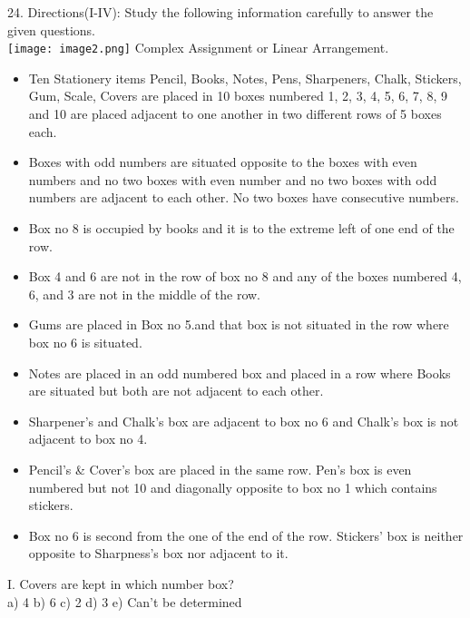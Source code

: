 \documentclass[
]{article}
\begin{document}
24. Directions(I-IV): Study the following information carefully to answer the given questions.\\
\texttt{[image: image2.png]}
Complex Assignment or Linear Arrangement.\\
\begin{itemize}
\item Ten Stationery items Pencil, Books, Notes, Pens, Sharpeners, Chalk, Stickers, Gum, Scale,
Covers are placed in 10 boxes numbered 1, 2, 3, 4, 5, 6, 7, 8, 9 and 10 are placed adjacent to
one another in two different rows of 5 boxes each.\\
\item Boxes with odd numbers are situated opposite to the boxes with even numbers and no
two boxes with even number and no two boxes with odd numbers are adjacent to each
other. No two boxes have consecutive numbers.\\
\item Box no 8 is occupied by books and it is to the extreme left of one end of the row.
\item Box 4 and 6 are not in the row of box no 8 and any of the boxes numbered 4, 6, and 3 are
not in the middle of the row.
\item Gums are placed in Box no 5.and that box is not situated in the row where box no 6 is
situated.
\item Notes are placed in an odd numbered box and placed in a row where Books are situated
but both are not adjacent to each other.\\
\item Sharpener's and Chalk’s box are adjacent to box no 6 and Chalk’s box is not adjacent to
box no 4.\\
\item Pencil’s \& Cover’s box are placed in the same row. Pen’s box is even numbered but not 10 and diagonally opposite to box no 1 which contains stickers.\\
\item Box no 6 is second from the one of the end of the row. Stickers’ box is neither opposite to
Sharpness's box nor adjacent to it.\\
\end{itemize}

I. Covers are kept in which number box?\\
a) 4 \hspace{2mm}b) 6 \hspace{2mm}c) 2 \hspace{2mm}d) 3 \hspace{2mm}e) Can’t be determined\\
\end{document}
